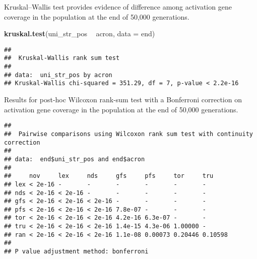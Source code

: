\documentclass[]{book}
\newenvironment{Shaded}{\begin{snugshade}}{\end{snugshade}}
\newcommand{\DataTypeTok}[1]{\textcolor[rgb]{0.13,0.29,0.53}{#1}}
\newcommand{\KeywordTok}[1]{\textcolor[rgb]{0.13,0.29,0.53}{\textbf{#1}}}
\newcommand{\NormalTok}[1]{#1}
\newcommand{\OperatorTok}[1]{\textcolor[rgb]{0.81,0.36,0.00}{\textbf{#1}}}
\newcommand{\OtherTok}[1]{\textcolor[rgb]{0.56,0.35,0.01}{#1}}
\newcommand{\StringTok}[1]{\textcolor[rgb]{0.31,0.60,0.02}{#1}}
\begin{document}
Kruskal--Wallis test provides evidence of difference among activation gene coverage in the population at the end of 50,000 generations.

\begin{Shaded}
\begin{Highlighting}[]
\KeywordTok{kruskal.test}\NormalTok{(uni_str_pos }\OperatorTok{~}\StringTok{ }\NormalTok{acron, }\DataTypeTok{data =}\NormalTok{ end)}
\end{Highlighting}
\end{Shaded}

\begin{verbatim}
## 
##  Kruskal-Wallis rank sum test
## 
## data:  uni_str_pos by acron
## Kruskal-Wallis chi-squared = 351.29, df = 7, p-value < 2.2e-16
\end{verbatim}

Results for post-hoc Wilcoxon rank-sum test with a Bonferroni correction on activation gene coverage in the population at the end of 50,000 generations.

\begin{Shaded}
\end{Shaded}

\begin{verbatim}
## 
##  Pairwise comparisons using Wilcoxon rank sum test with continuity correction 
## 
## data:  end$uni_str_pos and end$acron 
## 
##     nov     lex     nds     gfs     pfs     tor     tru    
## lex < 2e-16 -       -       -       -       -       -      
## nds < 2e-16 < 2e-16 -       -       -       -       -      
## gfs < 2e-16 < 2e-16 < 2e-16 -       -       -       -      
## pfs < 2e-16 < 2e-16 < 2e-16 7.8e-07 -       -       -      
## tor < 2e-16 < 2e-16 < 2e-16 4.2e-16 6.3e-07 -       -      
## tru < 2e-16 < 2e-16 < 2e-16 1.4e-15 4.3e-06 1.00000 -      
## ran < 2e-16 < 2e-16 < 2e-16 1.1e-08 0.00073 0.20446 0.10598
## 
## P value adjustment method: bonferroni
\end{verbatim}
\end{document}
